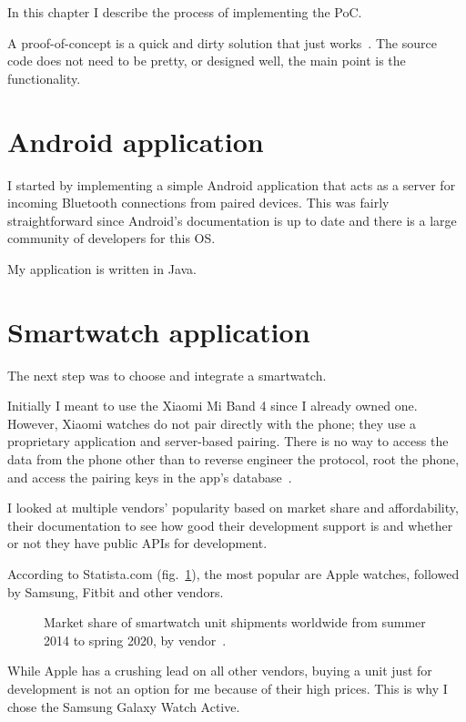 In this chapter I describe the process of implementing the PoC.

A proof-of-concept is a quick and dirty solution that just works~\cite{poc}.
The source code does not need to be pretty, or designed well, the main point is the functionality.

\section{Android application}

I started by implementing a simple Android application that acts as a server for incoming Bluetooth connections from paired devices.
This was fairly straightforward since Android's documentation is up to date and there is a large community of developers for this OS.

My application is written in Java.

\section{Smartwatch application}
The next step was to choose and integrate a smartwatch.

Initially I meant to use the Xiaomi Mi Band 4 since I already owned one.
However, Xiaomi watches do not pair directly with the phone; they use a proprietary application and server-based pairing.
There is no way to access the data from the phone other than to reverse engineer the protocol, root the phone, and access the pairing keys in the app's database~\cite{miband4-server-based}.

I looked at multiple vendors' popularity based on market share and affordability, their documentation to see how good their development support is and whether or not they have public APIs for development.

According to Statista.com (fig.~\ref{fig:watch_market_share}), the most popular are Apple watches, followed by Samsung, Fitbit and other vendors.

\begin{figure}[h]
    \caption{Market share of smartwatch unit shipments worldwide from summer 2014 to spring 2020, by vendor~\cite{watch_market_share}.}
    \label{fig:watch_market_share}
\end{figure}

While Apple has a crushing lead on all other vendors, buying a unit just for development is not an option for me because of their high prices.
This is why I chose the Samsung Galaxy Watch Active.

